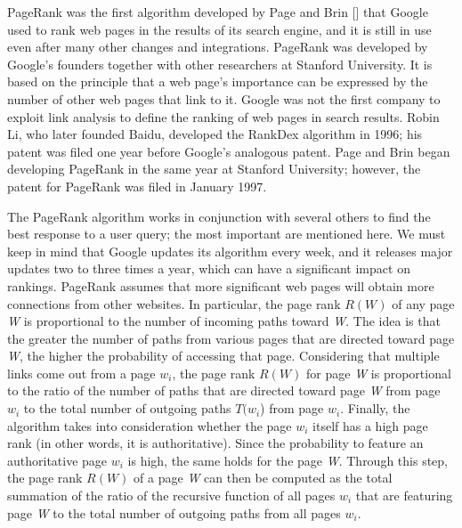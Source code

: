 PageRank was the first algorithm developed by Page and Brin [\citealt{chap:05:Pageetal:1999}] that Google used to rank web pages in the results of its search engine, and it is still in use even after many other changes and integrations. PageRank was developed by Google's founders together with other researchers at Stanford University. It is based on the principle that a web page's importance can be expressed by the number of other web pages that link to it. Google was not the first company to exploit link analysis to define the ranking of web pages in search results. Robin Li, who later founded Baidu, developed the RankDex algorithm in 1996; his patent was filed one year before Google's analogous patent. Page and Brin began developing PageRank in the same year at Stanford University; however, the patent for PageRank was filed in January 1997.

The PageRank algorithm works in conjunction with several others to find the best response to a user query; the most important are mentioned here. We must keep in mind that Google updates its algorithm every week, and it releases major updates two to three times a year, which can have a significant impact on rankings. PageRank assumes that more significant web pages will obtain more connections from other websites. In particular, the page rank $R(W)$ of any page \textit{W} is proportional to the number of incoming paths toward \textit{W}. The idea is that the greater the number of paths from various pages that are directed toward page \textit{W}, the higher the probability of accessing that page. Considering that multiple links come out from a page $w{}_{i}$, the page rank $R(W)$ for page \textit{W} is proportional to the ratio of the number of paths that are directed toward page \textit{W} from page $w{}_{i}$ to the total number of outgoing paths $T(w{}_{i}$) from page $w{}_{i}$. Finally, the algorithm takes into consideration whether the page $w{}_{i}$ itself has a high page rank (in other words, it is authoritative). Since the probability to feature an authoritative page $w{}_i$ is high, the same holds for the page \textit{W}. Through this step, the page rank $R(W)$ of a page \textit{W} can then be computed as the total summation of the ratio of the recursive function of all pages $w{}_{i}$ that are featuring page \textit{W} to the total number of outgoing paths from all pages $w{}_{i}$.

